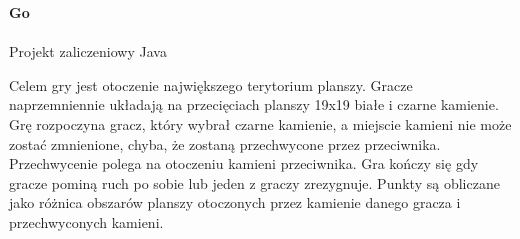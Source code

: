 \documentclass{article}
\begin{document}
\begin{center}\vspace{-1cm}
    \textbf{ \huge Go}\\~\\
    \large Projekt zaliczeniowy Java\\
\end{center}

Celem gry jest otoczenie największego terytorium planszy. Gracze
naprzemniennie układają na przecięciach planszy 19x19 białe i czarne kamienie.
Grę rozpoczyna gracz, który wybrał czarne kamienie, a miejscie kamieni nie
może zostać zmnienione, chyba, że zostaną przechwycone przez przeciwnika.
Przechwycenie polega na otoczeniu kamieni przeciwnika. Gra kończy się gdy
gracze pominą ruch po sobie lub jeden z graczy zrezygnuje. Punkty są
obliczane jako różnica obszarów planszy otoczonych przez kamienie danego
gracza i przechwyconych kamieni.\\
\end{document}
